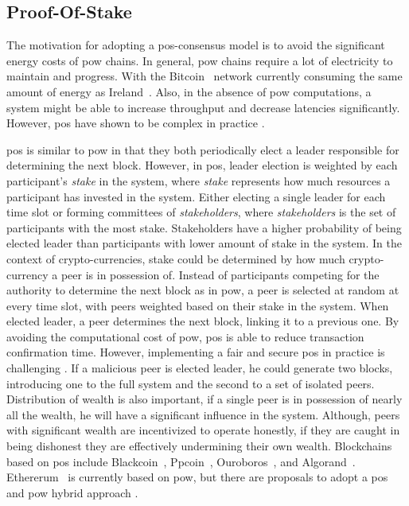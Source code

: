 \documentclass[USenglish]{uit-thesis}
\begin{document}
\subsection{Proof-Of-Stake}
The motivation for adopting a \gls{pos}-consensus model is to avoid the significant energy costs of \gls{pow} chains.
In general, \gls{pow} chains require a lot of electricity to maintain and progress.
With the Bitcoin~\cite{bitcoin} network currently consuming the same amount of energy as Ireland~\cite{bitenergy}.
Also, in the absence of \gls{pow} computations, a system might be able to increase throughput and decrease latencies significantly.
However, \gls{pos} have shown to be complex in practice \cite{challengepos}.   

\gls{pos} is similar to \gls{pow} in that they both periodically elect a leader responsible for determining the next block.
However, in \gls{pos}, leader election is weighted by each participant's \textit{stake} in the system, where \textit{stake} represents how much resources a participant has invested in the system.
Either electing a single leader for each time slot or forming committees of \textit{stakeholders}, where \textit{stakeholders} is the set of participants with the most stake.
Stakeholders have a higher probability of being elected leader than participants with lower amount of stake in the system. 
In the context of crypto-currencies, stake could be determined by how much crypto-currency a peer is in possession of.
Instead of participants competing for the authority to determine the next block as in \gls{pow}, a peer is selected at random at every time slot, with peers weighted based on their stake in the system.
When elected leader, a peer determines the next block, linking it to a previous one.
By avoiding the computational cost of \gls{pow}, \gls{pos} is able to reduce transaction confirmation time.
However, implementing a fair and secure \gls{pos} in practice is challenging \cite{challengepos}. 
If a malicious peer is elected leader, he could generate two blocks, introducing one to the full system and the second to a set of isolated peers.
Distribution of wealth is also important, if a single peer is in possession of nearly all the wealth, he will have a significant influence in the system.
Although, peers with significant wealth are incentivized to operate honestly, if they are caught in being dishonest they are effectively undermining their own wealth.
Blockchains based on \gls{pos} include Blackcoin~\cite{blackcoin}, Ppcoin~\cite{ppcoin}, Ouroboros~\cite{provepos}, and Algorand~\cite{algorand}.
Ethererum~\cite{ether} is currently based on \gls{pow}, but there are proposals to adopt a \gls{pos} and \gls{pow} hybrid approach \cite{casper}.
\end{document}

